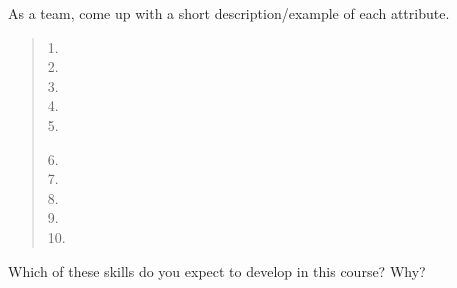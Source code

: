 \begin{answer}[3em]
\end{answer}


\Q As a team, come up with a short description/example of each attribute.

\begin{quote}
\begin{multicols}{2}
1.\\[1ex]
2.\\[1ex]
3.\\[1ex]
4.\\[1ex]
5.

6.\\[1ex]
7.\\[1ex]
8.\\[1ex]
9.\\[1ex]
10.
\end{multicols}
\end{quote}


\Q Which of these skills do you expect to develop in this course? Why?

\begin{answer}[3em]
\end{answer}
